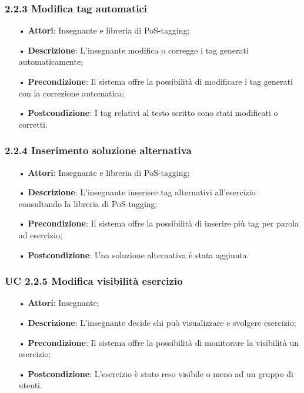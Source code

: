 \subsubsection{2.2.3 Modifica tag automatici}
\begin{itemize}
	\item[•] \textbf{Attori}: Insegnante e libreria di PoS-tagging;
	\item[•] \textbf{Descrizione}: L’insegnante modifica o corregge i tag generati automaticamente;
	\item[•] \textbf{Precondizione}: Il sistema offre la possibilità di modificare i tag generati con la correzione automatica;
	\item[•] \textbf{Postcondizione}: I tag relativi al testo scritto sono stati modificati o corretti.
\end{itemize}
\subsubsection{2.2.4 Inserimento soluzione alternativa}
\begin{itemize}
	\item[•] \textbf{Attori}: Insegnante e libreria di PoS-tagging;
	\item[•] \textbf{Descrizione}: L'insegnante inserisce tag alternativi all’esercizio consultando la libreria di PoS-tagging;
	\item[•] \textbf{Precondizione}: Il sistema offre la possibilità di inserire più tag per parola ad esercizio;
	\item[•] \textbf{Postcondizione}: Una soluzione alternativa è stata aggiunta.
\end{itemize}
\subsubsection{UC 2.2.5 Modifica visibilità esercizio}
\begin{itemize}
	\item[•] \textbf{Attori}: Insegnante;
	\item[•] \textbf{Descrizione}: L'insegnante decide chi può visualizzare e svolgere esercizio;
	\item[•] \textbf{Precondizione}: Il sistema offre la possibilità di monitorare la visibilità un esercizio;
	\item[•] \textbf{Postcondizione}: L’esercizio è stato reso visibile o meno ad un gruppo di utenti.
\end{itemize}
